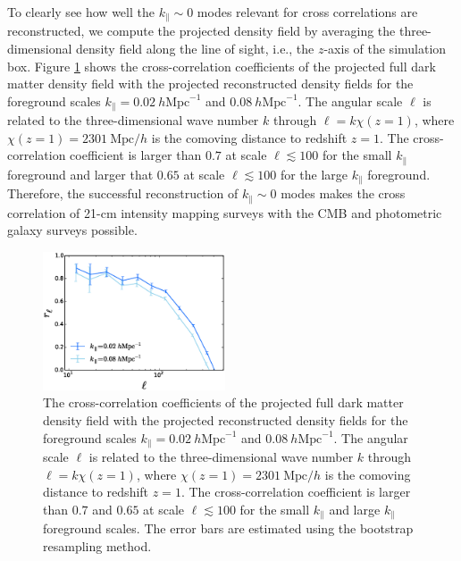 \documentclass[prd,superscriptaddress,floatfix,notitlepage,nofootinbib,reprint]{revtex4-1}
\newcommand{\mr}{\mathrm}
\newcommand{\kpa}{k_\parallel}
\begin{document}
To clearly see how well the $\kpa\sim0$ modes relevant for cross correlations 
are reconstructed, we compute the projected density field by averaging the 
three-dimensional density field along the line of sight, i.e., the $z$-axis
of the simulation box.
Figure \ref{fig:cc} shows the cross-correlation coefficients of the projected full dark matter density field with the projected reconstructed density fields for
the foreground scales $\kpa=0.02\ h\mr{Mpc}^{-1}$ and $0.08\ h\mr{Mpc}^{-1}$.
The angular scale $\ell$ is related to the three-dimensional wave number $k$
through $\ell=k\chi(z=1)$, where $\chi(z=1)=2301\ \mr{Mpc}/h$ is the comoving
distance to redshift $z=1$. The cross-correlation coefficient is larger than 
$0.7$ at scale $\ell\lesssim100$ for the small $\kpa$ foreground and larger 
that $0.65$ at scale $\ell\lesssim100$ for the large $\kpa$ foreground.
Therefore, the successful reconstruction of $\kpa\sim0$ modes makes the cross
correlation of  21-cm intensity mapping surveys with the CMB and photometric 
galaxy surveys possible.

\begin{figure}[tbp]
\begin{center}
\includegraphics[width=0.48\textwidth]{./figs/xcc.eps}
\end{center}
\vspace{-0.7cm}
\caption{The cross-correlation coefficients of the projected full dark matter
density field with the projected reconstructed density fields for the 
foreground scales $\kpa=0.02\ h\mr{Mpc}^{-1}$ and $0.08\ h\mr{Mpc}^{-1}$.
The angular scale $\ell$ is related to the three-dimensional wave number $k$
through $\ell=k\chi(z=1)$, where $\chi(z=1)=2301\ \mr{Mpc}/h$ is the comoving
distance to redshift $z=1$. The cross-correlation coefficient is larger than 
$0.7$ and $0.65$ at scale $\ell\lesssim100$ for the small $\kpa$ and large 
$\kpa$ foreground scales.
The error bars are estimated using the bootstrap resampling method.}
\label{fig:cc}
\end{figure}
\end{document}

